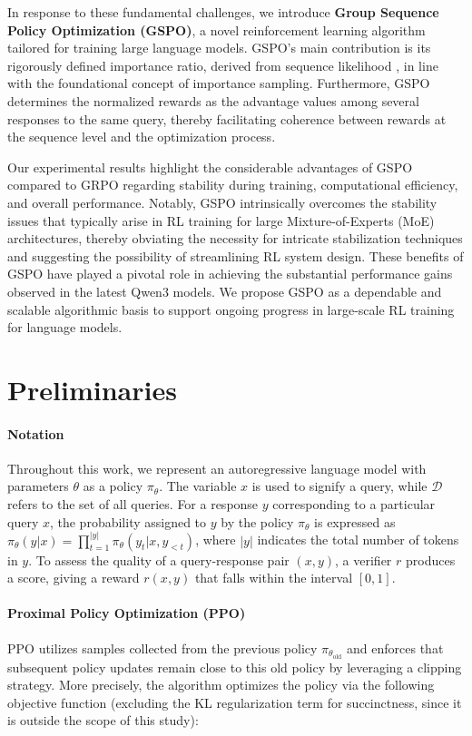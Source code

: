 In response to these fundamental challenges, we introduce \textbf{Group Sequence Policy Optimization (GSPO)}, a novel reinforcement learning algorithm tailored for training large language models. GSPO's main contribution is its rigorously defined importance ratio, derived from sequence likelihood \citep{click}, in line with the foundational concept of importance sampling. Furthermore, GSPO determines the normalized rewards as the advantage values among several responses to the same query, thereby facilitating coherence between rewards at the sequence level and the optimization process.

Our experimental results highlight the considerable advantages of GSPO compared to GRPO regarding stability during training, computational efficiency, and overall performance. Notably, GSPO intrinsically overcomes the stability issues that typically arise in RL training for large Mixture-of-Experts (MoE) architectures, thereby obviating the necessity for intricate stabilization techniques and suggesting the possibility of streamlining RL system design. These benefits of GSPO have played a pivotal role in achieving the substantial performance gains observed in the latest Qwen3 models. We propose GSPO as a dependable and scalable algorithmic basis to support ongoing progress in large-scale RL training for language models.

\section{Preliminaries}

\paragraph{Notation}
Throughout this work, we represent an autoregressive language model with parameters $\theta$ as a policy $\pi_\theta$. The variable $x$ is used to signify a query, while $\mathcal{D}$ refers to the set of all queries. For a response $y$ corresponding to a particular query $x$, the probability assigned to $y$ by the policy $\pi_\theta$ is expressed as $\pi_\theta (y | x)=\prod_{t=1}^{|y|} \pi_\theta (y_t | x, y_{<t} )$, where $|y|$ indicates the total number of tokens in $y$. To assess the quality of a query-response pair $(x, y)$, a verifier $r$ produces a score, giving a reward $r(x, y)$ that falls within the interval $[ 0, 1 ]$.

\paragraph{Proximal Policy Optimization (PPO)} PPO \citep{ppo} utilizes samples collected from the previous policy $\pi_{\theta_\text{old}}$ and enforces that subsequent policy updates remain close to this old policy by leveraging a clipping strategy. More precisely, the algorithm optimizes the policy via the following objective function (excluding the KL regularization term for succinctness, since it is outside the scope of this study):


